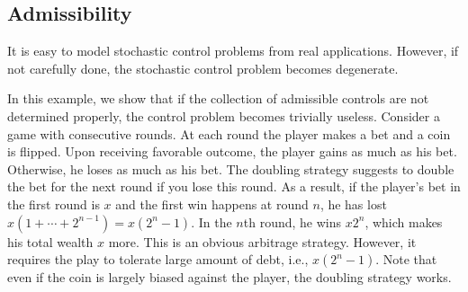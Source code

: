\documentclass[11pt]{book}
\newcommand{\dX}{\text{\normalfont d}X}
\newcommand{\dW}{\text{\normalfont d}W}
\begin{document}
\subsection{Admissibility}
It is easy to model stochastic control problems from real applications.  However, if not carefully done, the stochastic control problem becomes degenerate.

\begin{ex}\label{eg:admissibility_paradox}
In this example, we show that if the collection of admissible controls are not determined properly, the control problem becomes trivially useless. Consider a game with consecutive rounds. At each round the player makes a bet and a coin is flipped. Upon receiving favorable outcome, the player gains as much as his bet. Otherwise, he loses as much as his bet. 
The doubling strategy suggests to double the bet for the next round if you lose this round. As a result, if the player's bet in the first round is $x$ and the first win happens at round $n$, he has lost $x(1+\cdots+2^{n-1})=x(2^{n}-1)$. In the $n$th round, he wins $x2^n$, which makes his total wealth $x$ more. This is an obvious arbitrage strategy. However, it requires the play to tolerate large amount of debt, i.e., $x(2^{n}-1)$. Note that even if the coin is largely biased against the player, the doubling strategy works. 

 


\end{ex}
\end{document}
